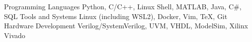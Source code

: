 
\begin{cvskills}

  \cvskill
    {Programming Languages} %
    {Python, C/C++, Linux Shell, MATLAB, Java, C\#, SQL} %
  \cvskill
    {Tools and Systems} %
    {Linux (including WSL2), Docker, Vim, TeX, Git} %
  \cvskill
    {Hardware Development} %
    {Verilog/SystemVerilog, UVM, VHDL, ModelSim, Xilinx Vivado} %
    
\end{cvskills}
